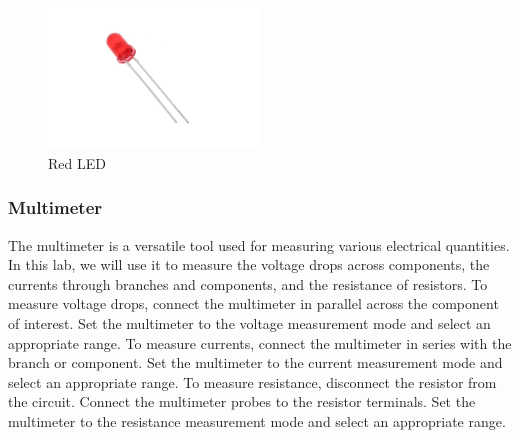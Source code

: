 \documentclass[a4paper, 10pt]{article}
\begin{document}
				\begin{figure}[h!]
					\centering
					\includegraphics[width = 0.5\textwidth]{images/LED.jpeg}
					\caption{Red LED}
					\label{fig:red_led}
				\end{figure}

			\pagebreak

			\subsubsection{Multimeter}
				The multimeter is a versatile tool used for measuring various electrical quantities. In this lab, we will use it to measure the voltage drops across components, the currents through branches and components, and the resistance of resistors.
				To measure voltage drops, connect the multimeter in parallel across the component of interest. Set the multimeter to the voltage measurement mode and select an appropriate range.
				To measure currents, connect the multimeter in series with the branch or component. Set the multimeter to the current measurement mode and select an appropriate range.
				To measure resistance, disconnect the resistor from the circuit. Connect the multimeter probes to the resistor terminals. Set the multimeter to the resistance measurement mode and select an appropriate range.
\end{document}
